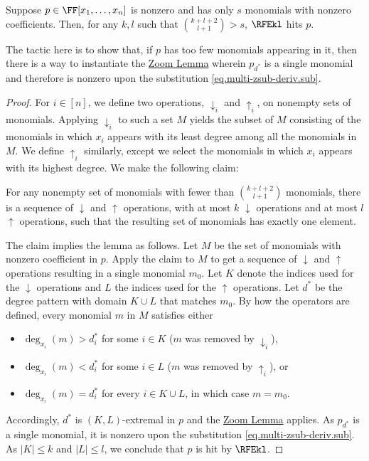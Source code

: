 \begin{lemma}
  \label{lem.rfe-hits-sparse}
  Suppose \(p \in \FF[x_1,\ldots,x_n]\)
  is nonzero and has only \(s\) monomials with nonzero coefficients.
  Then, for any \(k,l\) such that \(\binom{k+l+2}{l+1} > s\),
  \(\RFEkl\) hits \(p\).
\end{lemma}
\noindent
The tactic here is to show that,
if \(p\) has too few monomials appearing in it,
then there is a way to instantiate the \hyperref[lem.multi-zsub-deriv]{Zoom Lemma}
wherein \(p_{d^*}\) is a single monomial
and therefore is nonzero upon the substitution \eqref{eq.multi-zsub-deriv.sub}.
\begin{proof}
  For \(i\in [n]\), we define two operations,
  \(\downarrow_i\) and \(\uparrow_i\),
  on nonempty sets of monomials.
  Applying $\downarrow_i$ to such a set \({M}\) yields the subset of \({M}\) consisting of the monomials in which
  \(x_i\) appears with its least degree among all the monomials in
  \({M}\).
  We define \(\uparrow_i\) similarly,
  except we select the monomials in which \(x_i\) appears with its highest
  degree.
  We make the following claim:

  \begin{claim}
    \label{claim.lem.rfe-hits-sparse}
    For any nonempty set of monomials with fewer than
    \(\binom{k+l+2}{l+1}\) monomials,
    there is a sequence of \(\downarrow\) and \(\uparrow\) operations,
    with at most \(k\) \(\downarrow\) operations and at most \(l\)
    \(\uparrow\) operations,
    such that the resulting set of monomials has exactly one element.
  \end{claim}

  The claim implies the lemma as follows.
  Let \({M}\) be the set of monomials with nonzero coefficient in
  \(p\).
  Apply the claim to \({M}\) to get a sequence of \(\downarrow\)
  and \(\uparrow\) operations resulting in a single monomial
  \({m}_0\).
  Let \(K\) denote the indices used for the \(\downarrow\)
  operations and \(L\) the indices used for the \(\uparrow\)
  operations.
  Let \(d^*\) be the degree pattern with domain \(K \cup L\)
  that matches \({m}_0\).
  By how the operators are defined,
  every monomial \({m}\) in \({M}\) satisfies either
  \begin{itemize}
    \item
      \(\deg_{x_i}({m}) > d^*_i\) for some \(i\in K\)
      (\({m}\) was removed by \(\downarrow_i\)),
    \item
      \(\deg_{x_i}({m}) < d^*_i\) for some \(i\in L\)
      (\({m}\) was removed by \(\uparrow_i\)),
      or
    \item \(\deg_{x_i}({m}) = d^*_i\) for every \(i\in
      K\cup L\), in which case \({m} = {m}_0\).
  \end{itemize}
  Accordingly,
  $d^*$ is $(K,L)$-extremal in $p$ and the \hyperref[lem.multi-zsub-deriv]{Zoom Lemma} applies.
  As \(p_{d^*}\) is a single monomial,
  it is nonzero upon the substitution \eqref{eq.multi-zsub-deriv.sub}.
  As $|K|\le k$ and $|L|\le l$, we conclude that \(p\) is hit by \(\RFEkl\).


\end{proof}

